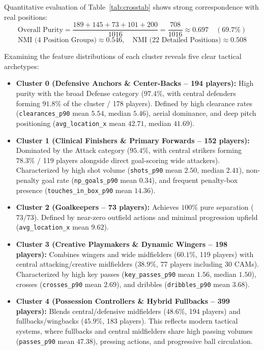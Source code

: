 \documentclass[12pt]{ai_conquer2026}
\begin{document}
Quantitative evaluation of Table~\ref{tab:crosstab} shows strong correspondence with real positions:
\[
\text{Overall Purity} = \frac{189 + 145 + 73 + 101 + 200}{1016} = \frac{708}{1016} \approx 0.697 \quad (69.7\%)
\]
\[
\text{NMI (4 Position Groups)} \approx 0.546, \quad \text{NMI (22 Detailed Positions)} \approx 0.508
\]

Examining the feature distributions of each cluster reveals five clear tactical archetypes:
\begin{itemize}
  \item \textbf{Cluster 0 (Defensive Anchors \& Center-Backs -- 194 players):} High purity with the broad Defense category ($97.4\%$, with central defenders forming $91.8\%$ of the cluster / 178 players). Defined by high clearance rates (\texttt{clearances\_p90} mean $5.54$, median $5.46$), aerial dominance, and deep pitch positioning (\texttt{avg\_location\_x} mean $42.71$, median $41.69$).
  \item \textbf{Cluster 1 (Clinical Finishers \& Primary Forwards -- 152 players):} Dominated by the Attack category ($95.4\%$, with central strikers forming $78.3\%$ / 119 players alongside direct goal-scoring wide attackers). Characterized by high shot volume (\texttt{shots\_p90} mean $2.50$, median $2.41$), non-penalty goal rate (\texttt{np\_goals\_p90} mean $0.34$), and frequent penalty-box presence (\texttt{touches\_in\_box\_p90} mean $14.36$).
  \item \textbf{Cluster 2 (Goalkeepers -- 73 players):} Achieves $100\%$ pure separation ($73/73$). Defined by near-zero outfield actions and minimal progression upfield (\texttt{avg\_location\_x} mean $9.62$).
  \item \textbf{Cluster 3 (Creative Playmakers \& Dynamic Wingers -- 198 players):} Combines wingers and wide midfielders ($60.1\%$, 119 players) with central attacking/creative midfielders ($38.9\%$, 77 players including 30 CAMs). Characterized by high key passes (\texttt{key\_passes\_p90} mean $1.56$, median $1.50$), crosses (\texttt{crosses\_p90} mean $2.69$), and dribbles (\texttt{dribbles\_p90} mean $3.68$).
  \item \textbf{Cluster 4 (Possession Controllers \& Hybrid Fullbacks -- 399 players):} Blends central/defensive midfielders ($48.6\%$, 194 players) and fullbacks/wingbacks ($45.9\%$, 183 players). This reflects modern tactical systems, where fullbacks and central midfielders share high passing volumes (\texttt{passes\_p90} mean $47.38$), pressing actions, and progressive ball circulation.
\end{itemize}
\end{document}
